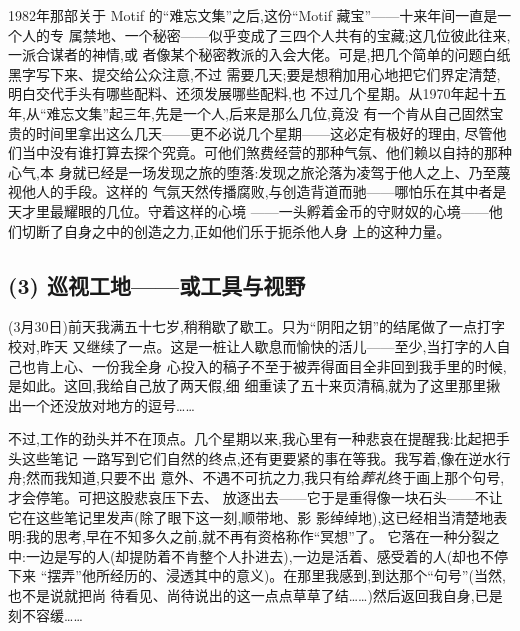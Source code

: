 1982年那部关于 Motif 的“难忘文集”之后,这份“Motif 藏宝”——十来年间一直是一个人的专
属禁地、一个秘密——似乎变成了三四个人共有的宝藏;这几位彼此往来,一派合谋者的神情,或
者像某个秘密教派的入会大佬。可是,把几个简单的问题白纸黑字写下来、提交给公众注意,不过
需要几天;要是想稍加用心地把它们界定清楚,明白交代手头有哪些配料、还须发展哪些配料,也
不过几个星期。从1970年起十五年,从“难忘文集”起三年,先是一个人,后来是那么几位,竟没
有一个肯从自己固然宝贵的时间里拿出这么几天——更不必说几个星期——这必定有极好的理由,
尽管他们当中没有谁打算去探个究竟。可他们煞费经营的那种气氛、他们赖以自持的那种心气,本
身就已经是一场发现之旅的堕落:发现之旅沦落为凌驾于他人之上、乃至蔑视他人的手段。这样的
气氛天然传播腐败,与创造背道而驰——哪怕乐在其中者是天才里最耀眼的几位。守着这样的心境
——一头孵着金币的守财奴的心境——他们切断了自身之中的创造之力,正如他们乐于扼杀他人身
上的这种力量。

\subsection{(3) 巡视工地——或工具与视野}   %


(3月30日)前天我满五十七岁,稍稍歇了歇工。只为“阴阳之钥”的结尾做了一点打字校对,昨天
又继续了一点。这是一桩让人歇息而愉快的活儿——至少,当打字的人自己也肯上心、一份我全身
心投入的稿子不至于被弄得面目全非回到我手里的时候,是如此。这回,我给自己放了两天假,\dmark{}细
细重读了五十来页清稿,就为了这里那里揪出一个还没放对地方的逗号……

不过,工作的劲头并不在顶点。几个星期以来,我心里有一种悲哀在提醒我:比起把手头这些笔记
一路写到它们自然的终点,还有更要紧的事在等我。我写着,像在逆水行舟;然而我知道,只要不出
意外、不遇不可抗之力,我只有给\emph{葬礼}终于画上那个句号,才会停笔。可把这股悲哀压下去、
放逐出去——它于是重得像一块石头——不让它在这些笔记里发声(除了眼下这一刻,顺带地、影
影绰绰地),这已经相当清楚地表明:我的思考,早在不知多久之前,就不再有资格称作“冥想”了。
它落在一种分裂之中:一边是写的人(却提防着不肯整个人扑进去),一边是活着、感受着的人(却也不停下来
“摆弄”他所经历的、浸透其中的意义)。在那里我感到,到达那个“句号”(当然,也不是说就把尚
待看见、尚待说出的这一点点草草了结……)然后返回我自身,已是刻不容缓……

